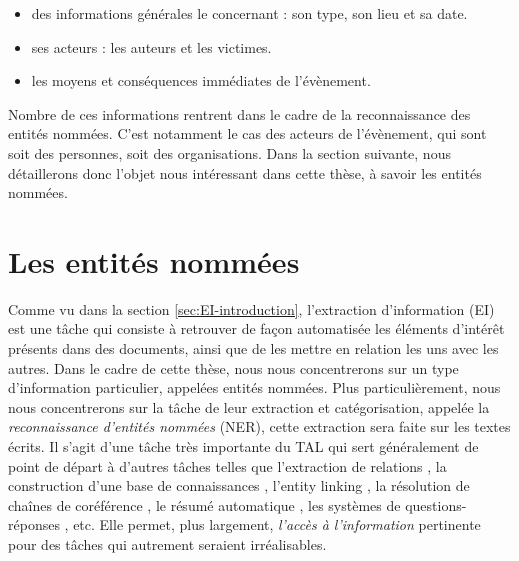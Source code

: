 \documentclass[12pt,a4paper,times,twoside,openright]{report}
\begin{document}
\begin{itemize}
    \item des informations générales le concernant : son type, son lieu et sa date.
    \item ses acteurs : les auteurs et les victimes.
    \item les moyens et conséquences immédiates de l'évènement.
\end{itemize}

Nombre de ces informations rentrent dans le cadre de la reconnaissance des entités nommées. C'est notamment le cas des acteurs de l'évènement, qui sont soit des personnes, soit des organisations. Dans la section suivante, nous détaillerons donc l'objet nous intéressant dans cette thèse, à savoir les entités nommées.



    \section{Les entités nommées}
    \label{sec:NE-introduction}
Comme vu dans la section \ref{sec:EI-introduction}, l'extraction d'information (EI) est une tâche qui consiste à retrouver de façon automatisée les éléments d'intérêt présents dans des documents, ainsi que de les mettre en relation les uns avec les autres. Dans le cadre de cette thèse, nous nous concentrerons sur un type d'information particulier, appelées entités nommées. Plus particulièrement, nous nous concentrerons sur la tâche de leur extraction et catégorisation, appelée la \emph{reconnaissance d'entités nommées} (NER), cette extraction sera faite sur les textes écrits. Il s'agit d'une tâche très importante du TAL qui sert généralement de point de départ à d'autres tâches telles que l'extraction de relations \citep{bunescu2005}, la construction d'une base de connaissances \citep{surdeanu2013overview}, l'entity linking \citep{doddington2004automatic}, la résolution de chaînes de coréférence \citep{denis2009global,durrett2014joint,hajishirzi2013joint}, le résumé automatique \citep{gupta2011named}, les systèmes de questions-réponses \citep{han2017answer}, etc. Elle permet, plus largement, \emph{l'accès à l'information} \citep{nouvel2015entites} pertinente pour des tâches qui autrement seraient irréalisables.
\end{document}
